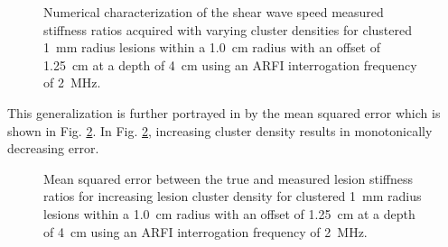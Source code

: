 			\begin{figure}[!htb]
				\centering
				\caption[Numerical characterization of shear wave speed measured stiffness ratio with clustered lesions]{Numerical characterization of the shear wave speed measured stiffness ratios acquired with varying cluster densities for clustered \SI{1}{\mm} radius lesions within a \SI{1.0}{cm} radius with an offset of \SI{1.25}{\cm} at a depth of \SI{4}{\cm} using an ARFI interrogation frequency of \SI{2}{\MHz}.}
				\label{fig:erel_cluster_density}
			\end{figure}

			This generalization is further portrayed in by the mean squared error which is shown in Fig. \ref{fig:erel_cluster_density_mse}. In Fig. \ref{fig:erel_cluster_density_mse}, increasing cluster density results in monotonically decreasing error.

			\begin{figure}[!htb]
				\centering
				\caption[Shear-wave speed quantified mean squared error related to small lesion cluster density]{Mean squared error between the true and measured lesion stiffness ratios for increasing lesion cluster density for clustered \SI{1}{\mm} radius lesions within a \SI{1.0}{cm} radius with an offset of \SI{1.25}{\cm} at a depth of \SI{4}{\cm} using an ARFI interrogation frequency of \SI{2}{\MHz}.}
				\label{fig:erel_cluster_density_mse}
			\end{figure}

